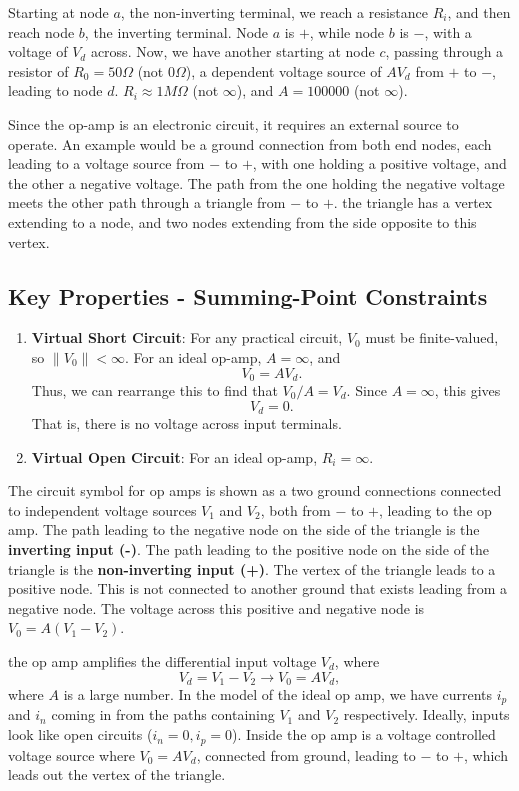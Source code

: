 \documentclass[11pt]{article}
\theoremstyle{plain} %
\theoremstyle{definition}
\theoremstyle{example}
\theoremstyle{remark}
\begin{document}
Starting at node $a$, the non-inverting terminal, we reach a resistance $R_i$, and then reach node $b$, the inverting terminal. Node $a$ is $+$, while node $b$ is $-$, with a voltage of $V_d$ across. Now, we have another starting at node $c$, passing through a resistor of $R_0 = 50\Omega$ (not $0\Omega$), a dependent voltage source of $AV_d$ from $+$ to $-$, leading to node $d$. $R_i \approx 1M\Omega$ (not $\infty$), and $A = 100000$ (not $\infty$).

Since the op-amp is an electronic circuit, it requires an external source to operate. An example would be a ground connection from both end nodes, each leading to a voltage source from $-$ to $+$, with one holding a positive voltage, and the other a negative voltage. The path from the one holding the negative voltage meets the other path through a triangle from $-$ to $+$. the triangle has a vertex extending to a node, and two nodes extending from the side opposite to this vertex. 

\subsection{Key Properties - Summing-Point Constraints}
\begin{enumerate}
	\item \textbf{Virtual Short Circuit}: For any practical circuit, $V_0$ must be finite-valued, so $\|V_0\| < \infty$. For an ideal op-amp, $A = \infty$, and $$V_0 = AV_d.$$ Thus, we can rearrange this to find that $V_0/A = V_d$. Since $A = \infty$, this gives 
	$$V_d = 0.$$ That is, there is no voltage across input terminals. 
	\item \textbf{Virtual Open Circuit}: For an ideal op-amp, $R_i = \infty$.
\end{enumerate}

The circuit symbol for op amps is shown as a two ground connections connected to independent voltage sources $V_1$ and $V_2$, both from $-$ to $+$, leading to the op amp. The path leading to the negative node on the side of the triangle is the \textbf{inverting input (-)}. The path leading to the positive node on the side of the triangle is the \textbf{non-inverting input (+)}. The vertex of the triangle leads to a positive node. This is not connected to another ground that exists leading from a negative node. The voltage across this positive and negative node is $V_0 = A(V_1-V_2)$. 

the op amp amplifies the differential input voltage $V_d$, where 
$$V_d = V_1-V_2 \rightarrow V_0 = AV_d,$$
where $A$ is a large number. In the model of the ideal op amp, we have currents $i_p$ and $i_n$ coming in from the paths containing $V_1$ and $V_2$ respectively. Ideally, inputs look like open circuits ($i_n = 0, i_p =0$). Inside the op amp is a voltage controlled voltage source where $V_0 = AV_d$, connected from ground, leading to $-$ to $+$, which leads out the vertex of the triangle. 
\end{document}
